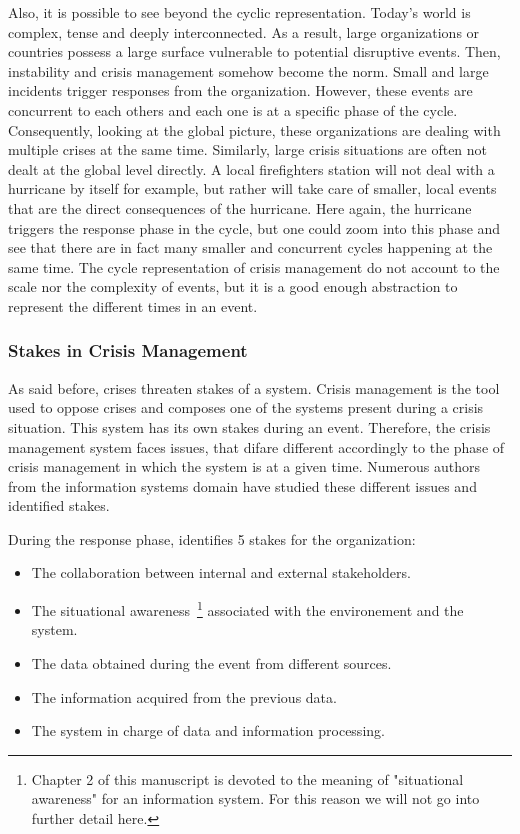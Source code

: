 Also, it is possible to see beyond the cyclic representation.
Today's world is complex, tense and deeply interconnected. %
As a result, large organizations or countries possess a large surface vulnerable to potential disruptive events.
Then, instability and crisis management somehow become the norm.
Small and large incidents trigger responses from the organization.
However, these events are concurrent to each others and each one is at a specific phase of the cycle.
Consequently, looking at the global picture, these organizations are dealing with multiple crises at the same time.
Similarly, large crisis situations are often not dealt at the global level directly.
A local firefighters station will not deal with a hurricane by itself for example, but rather will take care of smaller, local events that are the direct consequences of the hurricane.
Here again, the hurricane triggers the response phase in the cycle, but one could zoom into this phase and see that there are in fact many smaller and concurrent cycles happening at the same time.
The cycle representation of crisis management do not account to the scale nor the complexity of events, but it is a good enough abstraction to represent the different times in an event.

\subsubsection{Stakes in Crisis Management}
As said before, crises threaten stakes of a system.
Crisis management is the tool used to oppose crises and composes one of the systems present during a crisis situation.
This system has its own stakes during an event.
Therefore, the crisis management system faces issues, that difare different accordingly to the phase of crisis management in which the system is at a given time.
Numerous authors from the information systems domain have studied these different issues and identified stakes.

During the response phase, \cite[.~12--18]{fertierInterpretationAutomatiqueDonnees2018a} identifies 5 stakes for the organization:
\begin{itemize}
    \item The collaboration between internal and external stakeholders.
    \item The situational awareness~\footnote{Chapter 2 of this manuscript is devoted to the meaning of "situational awareness" for an information system. For this reason we will not go into further detail here.} associated with the environement and the system.
    \item The data obtained during the event from different sources.
    \item The information acquired from the previous data.
    \item The system in charge of data and information processing.
\end{itemize}

